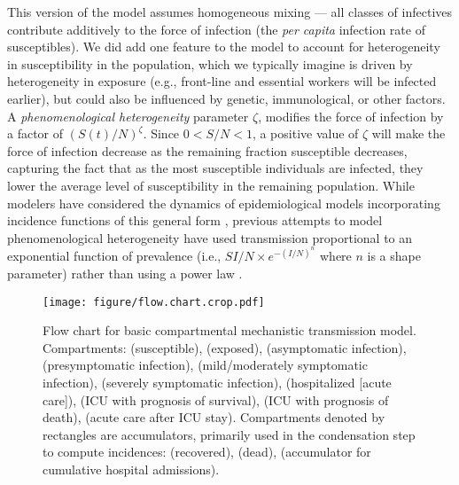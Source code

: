 \documentclass[12pt]{article}\usepackage[]{graphicx}\usepackage[]{color}
\begin{document}
This version of the model assumes homogeneous mixing --- all classes of infectives contribute additively to the force of infection (the \emph{per capita} infection rate of susceptibles).
We did add one feature to the model to account for heterogeneity in susceptibility in the population, which we typically imagine is driven by heterogeneity in exposure (e.g., front-line and essential workers will be infected earlier), but could also be influenced by genetic, immunological, or other factors.
A \emph{phenomenological heterogeneity} parameter  $\zeta$, modifies the force of infection by a factor of $\left(S(t)/N\right)^\zeta$. Since $0 < S/N < 1$, a positive value of $\zeta$ will make the force of infection decrease as the remaining fraction susceptible decreases, capturing the fact that as the most susceptible individuals are infected, they lower the average level of susceptibility in the remaining population. While modelers have considered the dynamics of epidemiological models incorporating incidence functions of this general form \cite{WilsWorc+45,Liu+87}, previous attempts to model phenomenological heterogeneity have used transmission proportional to an exponential function of prevalence (i.e., $S I/N \times e^{-(I/N)^n}$ where $n$ is a shape parameter) rather than using a power law \cite{Will+06,Gran+09}. 

\begin{figure}
\texttt{[image: figure/flow.chart.crop.pdf]}
\caption{Flow chart for basic compartmental mechanistic transmission model. 
Compartments:  (susceptible),  (exposed),  (asymptomatic infection),  (presymptomatic infection),  (mild/moderately symptomatic infection),  (severely symptomatic infection),  (hospitalized [acute care]),  (ICU with prognosis of survival),  (ICU with prognosis of death),  (acute care after ICU stay). 
Compartments denoted by rectangles are accumulators, primarily used in the condensation step to compute incidences:  (recovered),  (dead),  (accumulator for cumulative hospital admissions).
}
\label{fig:flowchart}
\end{figure}
\end{document}

